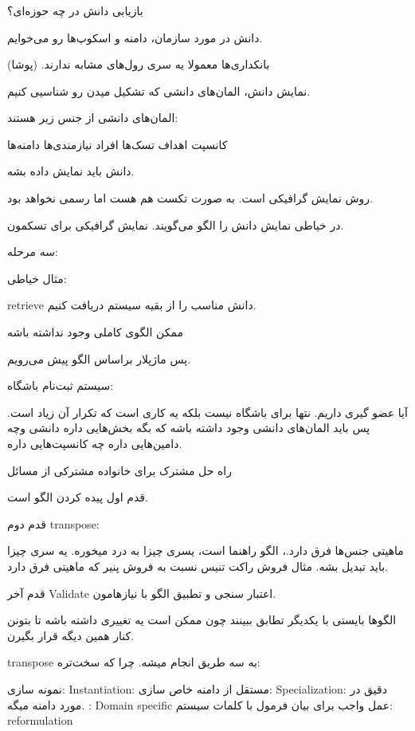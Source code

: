 \subsubsection{}

بازیابی دانش در چه حوزه‌ای؟

دانش در مورد سازمان، دامنه و اسکوپ‌ها رو می‌خوایم.

بانکداری‌ها معمولا یه سری رول‌های مشابه ندارند. (پوشا)

نمایش دانش، المان‌های دانشی که تشکیل میدن رو شناسیی کنیم. 

المان‌های دانشی از جنس زیر هستند:

کانسپت
اهداف
تسک‌ها
افراد
نیازمندی‌ها
دامنه‌ها

دانش باید نمایش داده بشه. 

روش نمایش گرافیکی است. به صورت تکست هم هست اما رسمی نخواهد بود.

در خیاطی نمایش دانش را الگو می‌گویند. نمایش گرافیکی برای تسکمون.

سه مرحله:

مثال خیاطی:

retrieve
دانش مناسب را از بقیه سیستم دریافت کنیم.

ممکن الگوی کاملی وجود نداشته باشه

پس ماژپلار براساس الگو پیش می‌رویم.

سیستم ثبت‌نام باشگاه:

آیا عضو گیری داریم. نتها برای باشگاه نیست بلکه یه کاری است که تکرار آن زیاد است.
پس باید المان‌های دانشی وجود داشته باشه که بگه بخش‌هایی داره دانشی وچه
دامین‌هایی داره چه کانسپت‌هایی داره.

راه حل مشترک برای خانواده مشترکی از مسائل

قدم اول پیده کردن الگو است.

قدم دوم transpose:

ماهیتی جنس‌ها فرق دارد.، الگو راهنما است، یسری چیزا به درد میخوره. یه سری چیزا
باید تبدیل بشه. مثال فروش راکت تنیس نسبت به فروش پنیر که ماهیتی فرق دارد.

قدم آخر Validate اعتبار سنجی و تطبیق الگو با نیاز‌هامون.

الگو‌ها بایستی با یکدیگر تطابق ببینند چون ممکن است یه تغییری داشته باشه تا بتونن
کنار همین دیگه قرار بگیرن.


transpose به سه طریق انجام میشه. چرا که سخت‌تره:

نمونه سازی: Instantiation: مستقل از دامنه
خاص سازی: Specialization: دقیق در مورد دامنه میگه. : Domain specific
عمل واجب برای بیان فرمول با کلمات سیستم: reformulation

